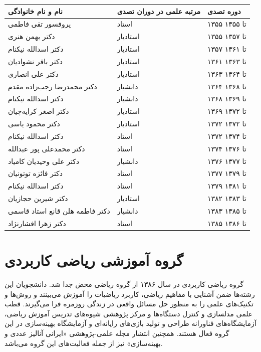 \documentclass[
  letterpaper,
  DIV=11,
  numbers=noendperiod]{scrreprt}
\newcounter{none} %
\begin{document}
{\def\LTcaptype{none} %
\begin{longtable}[]{@{}lll@{}}
\toprule\noalign{}
نام و نام خانوادگی & مرتبه علمی در دوران تصدی & دوره تصدی \\
\midrule\noalign{}
\endhead
\bottomrule\noalign{}
\endlastfoot
پروفسور تقی فاطمی & استاد & ۱۳۵۵ تا ۱۳۵۵ \\
دکتر بهمن هنری & استادیار & ۱۳۵۵ تا ۱۳۵۷ \\
دکتر اسدالله نیکنام & استادیار & ۱۳۵۷ تا ۱۳۶۱ \\
دکتر باقر نشوادیان & استادیار & ۱۳۶۱ تا ۱۳۶۳ \\
دکتر علی انصاری & استادیار & ۱۳۶۳ تا ۱۳۶۴ \\
دکتر محمدرضا رجب‌زاده مقدم & دانشیار & ۱۳۶۴ تا ۱۳۶۸ \\
دکتر اسدالله نیکنام & دانشیار & ۱۳۶۸ تا ۱۳۶۹ \\
دکتر اصغر کرایه‌چیان & استادیار & ۱۳۶۹ تا ۱۳۷۲ \\
دکتر محمود یاسی & استادیار & ۱۳۷۲ تا ۱۳۷۲ \\
دکتر اسدالله نیکنام & استاد & ۱۳۷۲ تا ۱۳۷۴ \\
دکتر محمدعلی پور عبدالله & استاد & ۱۳۷۴ تا ۱۳۷۶ \\
دکتر علی وحیدیان کامیاد & دانشیار & ۱۳۷۶ تا ۱۳۷۷ \\
دکتر فائزه توتونیان & استاد & ۱۳۷۷ تا ۱۳۷۹ \\
دکتر اسدالله نیکنام & استاد & ۱۳۷۹ تا ۱۳۸۱ \\
دکتر شیرین حجازیان & استادیار & ۱۳۸۲ تا ۱۳۸۳ \\
دکتر فاطمه هلن قانع استاد قاسمی & دانشیار & ۱۳۸۳ تا ۱۳۸۵ \\
دکتر زهرا افشارنژاد & استاد & ۱۳۸۵ تا ۱۳۸۶ \\
\end{longtable}
}

\section{گروه آموزشی ریاضی
کاربردی}\label{ux6afux631ux648ux647-ux622ux645ux648ux632ux634ux6cc-ux631ux6ccux627ux636ux6cc-ux6a9ux627ux631ux628ux631ux62fux6cc}

گروه ریاضی کاربردی در سال ۱۳۸۶ از گروه ریاضی محض جدا شد. دانشجویان این
رشته‌ها ضمن آشنایی با مفاهیم ریاضی، کاربرد ریاضیات را آموزش می‌بینند و
روش‌ها و تکنیک‌های علمی را به منظور حل مسائل واقعی در زندگی روزمره فرا
می‌گیرند. قطب علمی مدلسازی و کنترل دستگاه‌ها و مرکز پژوهشی شیوه‌های تدریس
آموزش ریاضی، آزمایشگاه‌های فناورانه طراحی و تولید بازی‌های رایانه‌ای و
آزمایشگاه بهینه‌سازی در این گروه فعال هستند. همچنین انتشار مجله
علمی-پژوهشی «ایرانی آنالیز عددی و بهینه‌سازی» نیز از جمله فعالیت‌های این
گروه می‌باشد.
\end{document}
